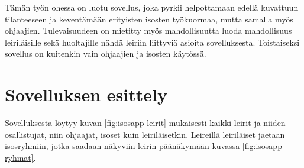 Tämän työn ohessa on luotu sovellus, joka pyrkii helpottamaan edellä kuvattuun
tilanteeseen ja keventämään erityisten isosten työkuormaa, mutta samalla myös
ohjaajien. Tulevaisuudeen on mietitty myös mahdollisuutta luoda mahdollisuus
leiriläisille sekä huoltajille nähdä leiriin liittyviä asioita sovelluksesta.
Toistaiseksi sovellus on kuitenkin vain ohjaajien ja isosten käytössä.

\section{Sovelluksen esittely}

Sovelluksesta löytyy kuvan \ref{fig:isosapp-leirit} mukaisesti kaikki leirit ja
niiden osallistujat, niin ohjaajat, isoset kuin leiriläisetkin. Leireillä
leiriläiset jaetaan isosryhmiin, jotka saadaan näkyviin leirin päänäkymään
kuvassa \ref{fig:isosapp-ryhmat}.

